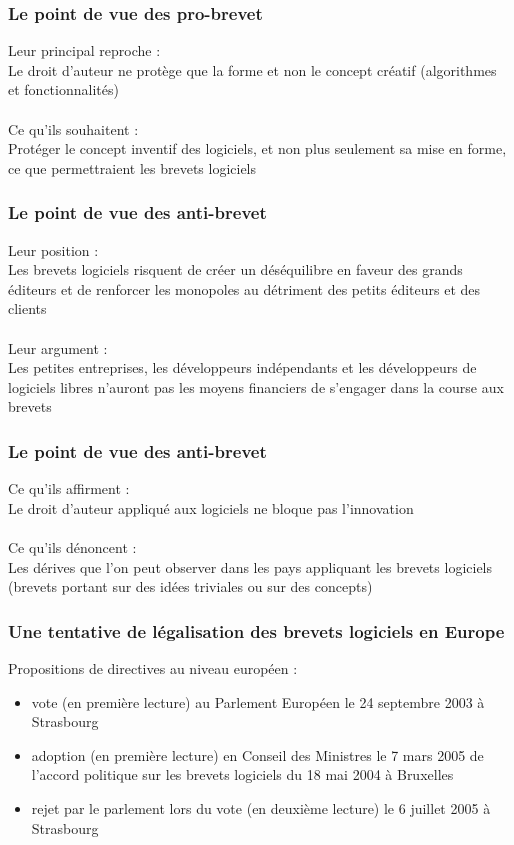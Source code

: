 \documentclass{beamer}
\begin{document}
\begin{frame}
\frametitle{Le point de vue des pro-brevet}
Leur principal reproche :\\
Le droit d'auteur ne protège que la forme et non le concept créatif (algorithmes et fonctionnalités)\\
~\\
Ce qu'ils souhaitent :\\
Protéger le concept inventif des logiciels, et non plus seulement sa mise en forme, ce que permettraient les brevets logiciels
\end{frame}

\begin{frame}
\frametitle{Le point de vue des anti-brevet}
Leur position :\\
Les brevets logiciels risquent de créer un déséquilibre en faveur des grands éditeurs et de renforcer les monopoles au détriment des petits éditeurs et des clients\\
~\\
Leur argument :\\
Les petites entreprises, les développeurs indépendants et les développeurs de logiciels libres n'auront pas les moyens financiers de s'engager dans la course aux brevets
\end{frame}

\begin{frame}
\frametitle{Le point de vue des anti-brevet}
Ce qu'ils affirment :\\
Le droit d'auteur appliqué aux logiciels ne bloque pas l'innovation\\
~\\
Ce qu'ils dénoncent :\\
Les dérives que l'on peut observer dans les pays appliquant les brevets logiciels (brevets portant sur des idées triviales ou sur des concepts)
\end{frame}

\begin{frame}
\frametitle{Une tentative de légalisation des brevets logiciels en Europe}
Propositions de directives au niveau européen :
\begin{itemize}
	\item vote (en première lecture) au Parlement Européen le 24 septembre 2003 à Strasbourg
	\item adoption (en première lecture) en Conseil des Ministres le 7 mars 2005 de l'accord politique sur les brevets logiciels du 18 mai 2004 à Bruxelles
	\item rejet par le parlement lors du vote (en deuxième lecture) le 6 juillet 2005 à Strasbourg
\end{itemize}
\end{frame}
\end{document}
